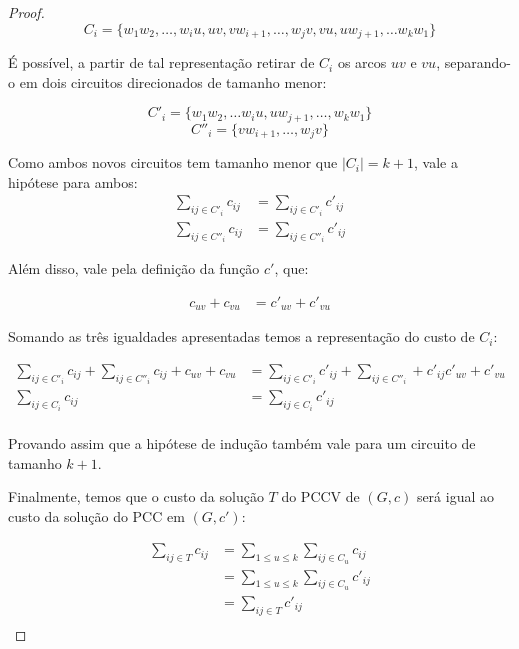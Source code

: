 \begin{proof}
            \[
                C_i = \{ w_1w_2, \dots, w_iu, uv, vw_{i+1}, \dots, w_jv,  vu, uw_{j+1}, \dots w_kw_1\}
            \]

            É possível, a partir de tal representação retirar de $C_i$ os arcos $uv$ e $vu$, separando-o em dois circuitos direcionados de tamanho menor:

            \[
                C'_i = \{w_1w_2, \dots w_iu, uw_{j+1}, \dots, w_kw_1\} 
            \]
            \[
                C''_i = \{vw_{i+1}, \dots, w_jv\}
            \]

            Como ambos novos circuitos tem tamanho menor que $|C_i| = k+1$, vale a hipótese para ambos:
            \begin{align}
                \sum_{ij \in C'_i} c_{ij} &= \sum_{ij \in C'_i} c'_{ij} \\
                \sum_{ij \in C''_i} c_{ij} &= \sum_{ij \in C''_i} c'_{ij}
            \end{align}
            
            Além disso, vale pela definição da função $c'$, que:
            
            \begin{align}
                c_{uv} + c_{vu}  &= c'_{uv} + c'_{vu} 
            \end{align}

            Somando as três igualdades apresentadas temos a representação do custo de $C_i$:

            \begin{align*}
                \sum_{ij \in C'_i} c_{ij} +  \sum_{ij \in C''_i} c_{ij} + c_{uv} + c_{vu}  &= \sum_{ij \in C'_i} c'_{ij} + \sum_{ij \in C''_i} + c'_{ij} c'_{uv} + c'_{vu}  \\
                \sum_{ij \in C_i} c_{ij} &= \sum_{ij \in C_i} c'_{ij} \\
            \end{align*}
             
            Provando assim que a hipótese de indução também vale para um circuito de tamanho $k+1$.

            Finalmente, temos que o custo da solução $T$ do PCCV de $(G, c)$ será igual ao custo da solução do PCC em $(G, c')$:

            \begin{align*}
                \sum_{ij \in T} c_{ij} &= \sum_{1 \leq u \leq k} \sum_{ij \in C_u} c_{ij} \\
                                       &= \sum_{1 \leq u \leq k} \sum_{ij \in C_u} c'_{ij} \\
                                       &= \sum_{ij \in T} c'_{ij} \\
            \end{align*}



\end{proof}
